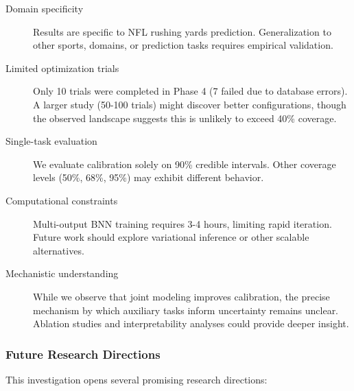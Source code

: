 \begin{description}
    \item[Domain specificity] Results are specific to NFL rushing yards prediction. Generalization to other sports, domains, or prediction tasks requires empirical validation.

    \item[Limited optimization trials] Only 10 trials were completed in Phase 4 (7 failed due to database errors). A larger study (50-100 trials) might discover better configurations, though the observed landscape suggests this is unlikely to exceed 40\% coverage.

    \item[Single-task evaluation] We evaluate calibration solely on 90\% credible intervals. Other coverage levels (50\%, 68\%, 95\%) may exhibit different behavior.

    \item[Computational constraints] Multi-output BNN training requires 3-4 hours, limiting rapid iteration. Future work should explore variational inference or other scalable alternatives.

    \item[Mechanistic understanding] While we observe that joint modeling improves calibration, the precise mechanism by which auxiliary tasks inform uncertainty remains unclear. Ablation studies and interpretability analyses could provide deeper insight.
\end{description}

\subsubsection{Future Research Directions}

This investigation opens several promising research directions:

